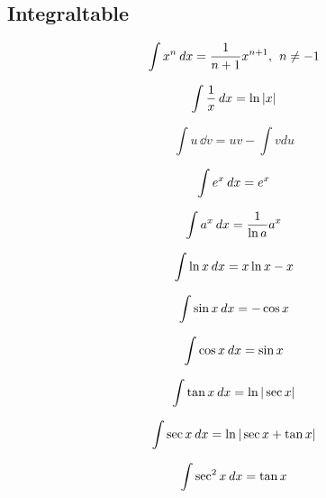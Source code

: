 \subsection{Integraltable}
\begin{center}	
	\begin{multicols}{2}
		
		\begin{equation}
			\int x^n \hspace{2pt}dx = \frac{1}{n+1}x^{n+1}, \hspace{1ex} n\neq-1
		\end{equation}
		
		\begin{equation}
			\int \frac{1}{x}\hspace{2pt}dx = \ln |x|
		\end{equation}
		
		\begin{equation}
			\int u \hspace{2pt} \dd{v} = uv - \int v du
		\end{equation}
		
		
		
		\begin{equation}
			\int e^x \hspace{2pt}dx = e^x 
		\end{equation}
		
		\begin{equation}
			\int a^x \hspace{2pt}dx = \frac{1}{\ln a} a^x
		\end{equation}
		
		\begin{equation}
			\int \ln x \hspace{2pt}dx = x \ln x - x
		\end{equation}
		
		
		\begin{equation}
			\int \sin x \hspace{2pt}dx = -\cos x
		\end{equation}
		
		\begin{equation}
			\int \cos x \hspace{2pt}dx = \sin x
		\end{equation}
		
		\begin{equation}
			\int \tan x \hspace{2pt}dx = \ln |\sec x| 
		\end{equation}
		
		\begin{equation}
			\int \sec x \hspace{2pt}dx = \ln |\sec x + \tan x|
		\end{equation}
		
		\begin{equation}
			\int \sec^2 x \hspace{2pt}dx = \tan x
		\end{equation}
		

\end{multicols}
\end{center}
